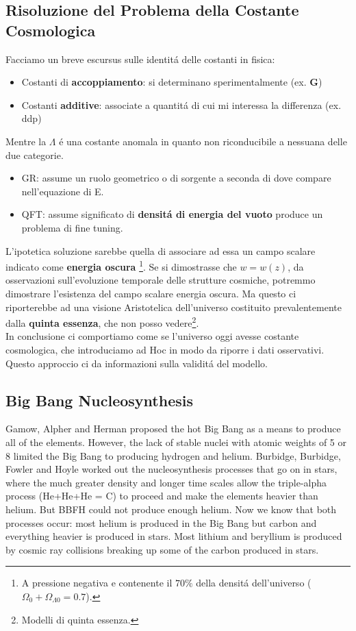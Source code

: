 \documentclass[12pt, a4paper]{article}
\begin{document}
\subsection{Risoluzione del Problema della Costante Cosmologica}
Facciamo un breve escursus sulle identit\'{a} delle costanti in fisica:
\begin{itemize}
\item Costanti di \textbf{accoppiamento}: si determinano sperimentalmente (ex. \textbf{G})
\item Costanti \textbf{additive}: associate a quantit\'{a} di cui mi interessa la differenza (ex. ddp)
\end{itemize}
Mentre la $\Lambda$ \'{e} una costante anomala in quanto non riconducibile a nessuana delle due categorie.
\begin{itemize}
\item GR: assume un ruolo geometrico o di sorgente a seconda di dove compare nell'equazione di E.
\item QFT: assume significato di \textbf{densit\'{a} di energia del vuoto} produce un problema di fine tuning.
\end{itemize}
L'ipotetica soluzione sarebbe quella di associare ad essa un campo scalare  indicato come \textbf{energia oscura} \footnote{A pressione negativa e contenente il $70\%$ della densit\'{a} dell'universo ($\Omega_0+ \Omega_{\Lambda 0}=0.7$).}. Se si dimostrasse che $w=w(z)$, da osservazioni sull'evoluzione temporale delle strutture cosmiche, potremmo dimostrare l'esistenza del campo scalare energia oscura. Ma questo ci riporterebbe ad una visione Aristotelica dell'universo costituito prevalentemente dalla \textbf{quinta essenza}, che non posso vedere\footnote{Modelli di quinta essenza.}.\\ In conclusione ci comportiamo come se l'universo oggi avesse costante cosmologica, che introduciamo ad Hoc in modo da riporre i dati osservativi. Questo approccio ci da informazioni sulla validit\'{a} del modello.
\subsection{Big Bang Nucleosynthesis}
Gamow, Alpher and Herman proposed the hot Big Bang as a means to produce all of the elements. However, the lack of stable nuclei with atomic weights of 5 or 8 limited the Big Bang to producing hydrogen and helium. Burbidge, Burbidge, Fowler and Hoyle worked out the nucleosynthesis processes that go on in stars, where the much greater density and longer time scales allow the triple-alpha process (He+He+He = C) to proceed and make the elements heavier than helium. But BBFH could not produce enough helium. Now we know that both processes occur: most helium is produced in the Big Bang but carbon and everything heavier is produced in stars. Most lithium and beryllium is produced by cosmic ray collisions breaking up some of the carbon produced in stars.
\end{document}
